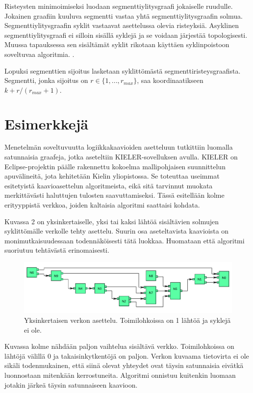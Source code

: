 \documentclass[finnish,12pt]{article}
\begin{document}
Risteysten minimoimiseksi luodaan segmenttiylitysgraafi jokaiselle ruudulle.
Jokainen graafiin kuuluva segmentti vastaa yhtä segmenttiylitysgraafin solmua.
Segmenttiylitysgraafin syklit vastaavat asettelussa olevia risteyksiä.
Asyklinen segmenttiylitysgraafi ei silloin sisällä syklejä ja se voidaan järjestää topologisesti.
Muussa tapauksessa sen sisältämät syklit rikotaan käyttäen syklinpoistoon soveltuvaa algoritmia. \cite{RefWorks:48}.

Lopuksi segmenttien sijoitus lasketaan syklittömästä segmenttiristeysgraafista.
Segmentti, jonka sijoitus on $r \in \{1,...,r_{max}\}$, saa koordinaatikseen $k + r/(r_{max} +1)$.

	\clearpage
	\section{Esimerkkejä}
	
Menetelmän soveltuvuutta logiikkakaavioiden asetteluun tutkittiin luomalla satunnaisia graafeja, jotka aseteltiin KIELER-sovelluksen avulla.
KIELER on Eclipse-projektin päälle rakennettu kokoelma mallipohjaisen suunnittelun apuvälineitä, jota kehitetään Kielin yliopistossa. \cite{RefWorks:123}
Se toteuttaa useimmat esitetyistä kaavioasettelun algoritmeista, eikä sitä tarvinnut muokata merkittävästi haluttujen tulosten saavuttamiseksi.
Tässä esitellään kolme erityyppistä verkkoa, joiden kaltaisia algoritmi saattaisi kohdata.

Kuvassa 2 on yksinkertaiselle, yksi tai kaksi lähtöä sisältävien solmujen syklittömälle verkolle tehty asettelu.
Suurin osa aseteltavista kaavioista on monimutkaisuudessaan todennäköisesti tätä luokkaa. Huomataan että algoritmi suoriutuu tehtävästä erinomaisesti.

\begin{figure}[ht]
	\includegraphics[width=\textwidth]{esim1.pdf}
	\caption{Yksinkertaisen verkon asettelu. Toimilohkoissa on 1 lähtöä ja syklejä ei ole.}
\end{figure}

Kuvassa kolme nähdään paljon vaihtelua sisältävä verkko.
Toimilohkoissa on lähtöjä välillä 0 ja takaisinkytkentöjä on paljon.
Verkon kuvaama tietovirta ei ole sikäli todenmukainen, että siinä olevat yhteydet ovat täysin satunnaisia eivätkä luonnostaan mitenkään kerrostuneita.
Algoritmi onnistuu kuitenkin luomaan jotakin järkeä täysin satunnaiseen kaavioon.
\end{document}
